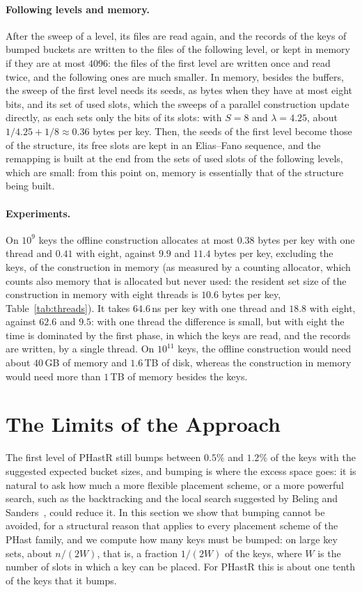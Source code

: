 \documentclass[11pt]{article}
\newcommand{\PHast}{PHast\xspace}
\newcommand{\PHastR}{PHastR\xspace}
\begin{document}
\paragraph{Following levels and memory.}
After the sweep of a level, its files are read again, and the records of the
keys of bumped buckets are written to the files of the following
level, or kept in memory if they are at most $4096$: the files of the first
level are written once and read twice, and the following ones are much
smaller. In memory, besides the buffers, the sweep of the first level needs its seeds, as bytes when they
have at most eight bits, and its set of used slots, which the sweeps of a
parallel construction update directly, as each sets only the bits of its
slots: with $S=8$ and $\lambda=4.25$, about $1/4.25+1/8\approx0.36$ bytes
per key. Then, the seeds of the first level become those of the structure,
its free slots are kept in an Elias--Fano sequence, and the remapping is
built at the end from the sets of used slots of the following levels, which
are small: from this point on, memory is essentially that of the structure
being built.

\paragraph{Experiments.}
On $10^9$ keys the offline construction allocates at most $0.38$ bytes per
key with one thread and $0.41$ with eight, against $9.9$ and $11.4$ bytes
per key, excluding the keys, of the construction in memory (as measured by a
counting allocator, which counts also memory that is allocated but never
used: the resident set size of the construction in memory with eight
threads is $10.6$ bytes per key, Table~\ref{tab:threads}). It takes $64.6$\,ns per key with one thread and $18.8$
with eight, against $62.6$ and $9.5$: with one thread the difference is
small, but with eight the time is dominated by the first phase, in which the
keys are read, and the records are written, by a single thread. On
$10^{11}$ keys, the offline construction would need about $40$\,GB of memory
and $1.6$\,TB of disk,
whereas the construction in memory would need more than $1$\,TB of memory
besides the keys.

\section{The Limits of the Approach}
\label{sec:limits}

The first level of \PHastR still bumps between $0.5\%$ and $1.2\%$ of the
keys with the suggested expected bucket sizes, and bumping is where the
excess space goes: it is natural to ask how much a more flexible placement
scheme, or a more powerful search, such as the backtracking and the local
search suggested by Beling and Sanders~\cite{BeSPHast}, could reduce it. In
this section we show that bumping cannot be avoided, for a structural reason
that applies to every placement scheme of the \PHast family, and we compute
how many keys must be bumped: on large key sets, about $n/(2W)$, that is,
a fraction $1/(2W)$ of the keys, where $W$ is the number of slots in which a
key can be placed. For \PHastR this is about one tenth of the keys that it bumps.
\end{document}
